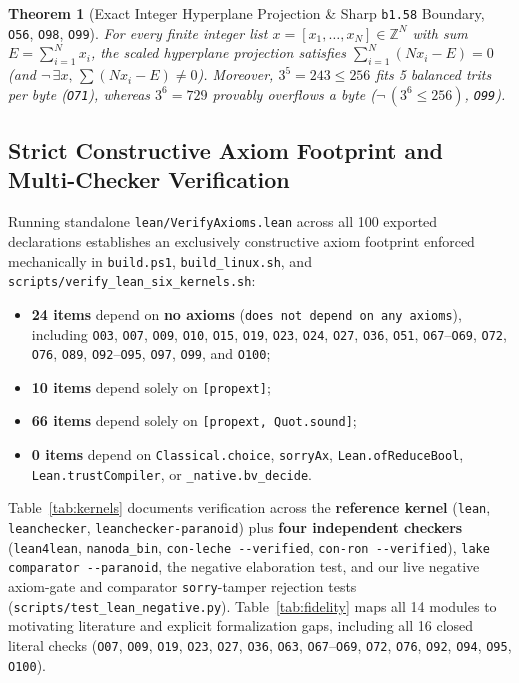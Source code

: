 \documentclass[11pt,reqno]{amsart}
\newtheorem{theorem}{Theorem}[section]
\begin{document}
\begin{theorem}[Exact Integer Hyperplane Projection \& Sharp \texttt{b1.58} Boundary, \texttt{O56}, \texttt{O98}, \texttt{O99}]
For every finite integer list $x = [x_1,\dots,x_N] \in \mathbb{Z}^N$ with sum $E = \sum_{i=1}^N x_i$, the scaled hyperplane projection satisfies $\sum_{i=1}^N (N x_i - E) = 0$ (and $\neg\,\exists x,\,\sum(N x_i - E) \ne 0$). Moreover, $3^5 = 243 \le 256$ fits 5 balanced trits per byte (\texttt{O71}), whereas $3^6 = 729$ provably overflows a byte ($\neg\,(3^6 \le 256)$, \texttt{O99}).
\end{theorem}

\subsection{Strict Constructive Axiom Footprint and Multi-Checker Verification}
Running standalone \nolinkurl{lean/VerifyAxioms.lean} across all 100 exported declarations establishes an exclusively constructive axiom footprint enforced mechanically in \nolinkurl{build.ps1}, \nolinkurl{build_linux.sh}, and \nolinkurl{scripts/verify_lean_six_kernels.sh}:
\begin{itemize}
  \item \textbf{24 items} depend on \textbf{no axioms} (\texttt{does not depend on any axioms}), including \texttt{O03}, \texttt{O07}, \texttt{O09}, \texttt{O10}, \texttt{O15}, \texttt{O19}, \texttt{O23}, \texttt{O24}, \texttt{O27}, \texttt{O36}, \texttt{O51}, \texttt{O67}--\texttt{O69}, \texttt{O72}, \texttt{O76}, \texttt{O89}, \texttt{O92}--\texttt{O95}, \texttt{O97}, \texttt{O99}, and \texttt{O100};
  \item \textbf{10 items} depend solely on \texttt{[propext]};
  \item \textbf{66 items} depend solely on \texttt{[propext, Quot.sound]};
  \item \textbf{0 items} depend on \nolinkurl{Classical.choice}, \nolinkurl{sorryAx}, \nolinkurl{Lean.ofReduceBool}, \nolinkurl{Lean.trustCompiler}, or \nolinkurl{_native.bv_decide}.
\end{itemize}
Table~\ref{tab:kernels} documents verification across the \textbf{reference kernel} (\texttt{lean}, \texttt{leanchecker}, \nolinkurl{leanchecker-paranoid}) plus \textbf{four independent checkers} (\texttt{lean4lean}, \nolinkurl{nanoda_bin}, \nolinkurl{con-leche --verified}, \nolinkurl{con-ron --verified}), \nolinkurl{lake comparator --paranoid}, the negative elaboration test, and our live negative axiom-gate and comparator \texttt{sorry}-tamper rejection tests (\nolinkurl{scripts/test_lean_negative.py}). Table~\ref{tab:fidelity} maps all 14 modules to motivating literature and explicit formalization gaps, including all 16 closed literal checks (\texttt{O07}, \texttt{O09}, \texttt{O19}, \texttt{O23}, \texttt{O27}, \texttt{O36}, \texttt{O63}, \texttt{O67}--\texttt{O69}, \texttt{O72}, \texttt{O76}, \texttt{O92}, \texttt{O94}, \texttt{O95}, \texttt{O100}).
\end{document}
